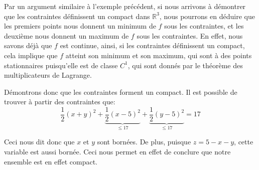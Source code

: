 \documentclass[a4paper]{article}
\begin{document}
{    Par un argument similaire à l'exemple précédent, si nous arrivons à démontrer que les contraintes définissent un compact dans $\mathbb{R}^3$, nous pourrons en déduire que les premiers points nous donnent un minimum de $f$ sous les contraintes, et les deuxième nous donnent un maximum de $f$ sous les contraintes. En effet, nous savons déjà que $f$ est continue, ainsi, si les contraintes définissent un compact, cela implique que $f$ atteint son minimum et son maximum, qui sont à des points stationnaires puisqu'elle est de classe $C^1$, qui sont donnés par le théorème des multiplicateurs de Lagrange.

    Démontrons donc que les contraintes forment un compact. Il est possible de trouver à partir des contraintes que: 
    \[\frac{1}{2}\left(x + y\right)^2 + \underbrace{\frac{1}{2}\left(x - 5\right)^2}_{\leq 17} + \underbrace{\frac{1}{2}\left(y - 5\right)^2}_{\leq 17} = 17\]
    
    Ceci nous dit donc que $x$ et $y$ sont bornées. De plus, puisque $z = 5 - x- y$, cette variable est aussi bornée. Ceci nous permet en effet de conclure que notre ensemble est en effet compact.
}
\end{document}
